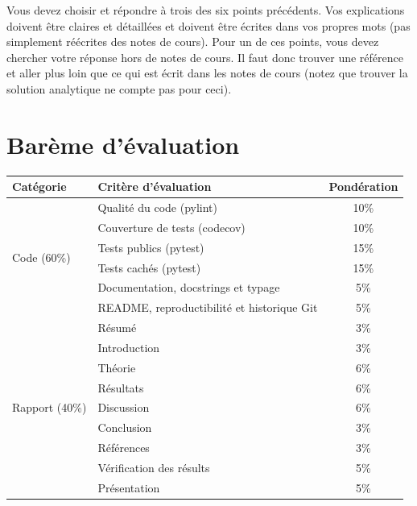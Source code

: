 \documentclass[12pt, letterpaper]{article}
\begin{document}
\bigskip

\noindent Vous devez choisir et répondre à trois des six points précédents.
Vos explications doivent être claires et détaillées et doivent être écrites dans vos propres mots (pas simplement réécrites des notes de cours).
Pour un de ces points, vous devez chercher votre réponse hors de notes de cours.
Il faut donc trouver une référence et aller plus loin que ce qui est écrit dans les notes de cours (notez que trouver la solution analytique ne compte pas pour ceci).

\section{Barème d'évaluation}\label{sec:bareme-evaluation}

\begin{tabular}{l l c}
	\toprule
	\textbf{Catégorie} & \textbf{Critère d’évaluation}              & \textbf{Pondération} \\
	\midrule
	\multirow{6}{*}{Code (60\%)}
	                   & Qualité du code (pylint)                   & 10\%                 \\
	                   & Couverture de tests (codecov)              & 10\%                 \\
	                   & Tests publics (pytest)                     & 15\%                 \\
	                   & Tests cachés (pytest)                      & 15\%                 \\
	                   & Documentation, docstrings et typage        & 5\%                  \\
	                   & README, reproductibilité et historique Git & 5\%                  \\
	\midrule
	\multirow{9}{*}{Rapport (40\%)}
	                   & Résumé                                     & 3\%                  \\
	                   & Introduction                               & 3\%                  \\
	                   & Théorie                                    & 6\%                  \\
	                   & Résultats                                  & 6\%                  \\
	                   & Discussion                                 & 6\%                  \\
	                   & Conclusion                                 & 3\%                  \\
	                   & Références                                 & 3\%                  \\
	                   & Vérification des résults                   & 5\%                  \\
	                   & Présentation                               & 5\%                  \\
	\bottomrule
\end{tabular}
\end{document}
